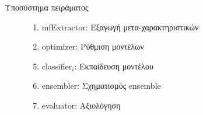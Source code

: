\documentclass{beamer}
\begin{document}
\begin{frame}{Υποσύστημα πειράματος}
\begin{figure}
\begin{minipage}{0.45\textwidth}
\begin{enumerate}
   	 				\item mfExtractor: Eξαγωγή μετα-χαρακτηριστικών
   	 				\item optimizer: Ρύθμιση μοντέλων
   	 			\end{enumerate}
   	 		\end{minipage}\qquad
   	 		\begin{minipage}{0.45\textwidth}
   	 			\begin{enumerate}
   	 				\setcounter{enumi}{4}
   	 				\item classifier$_i$: Εκπαίδευση μοντέλου
   	 				\item ensembler: Σχηματισμός ensemble
   	 				\item evaluator: Aξιολόγηση
   	 			\end{enumerate}
   	 		\end{minipage}
   	 	\end{figure}
   	 \end{frame}
\end{document}
